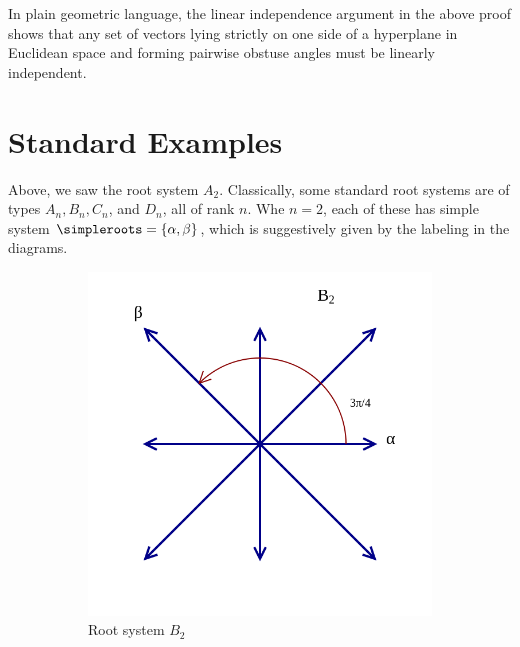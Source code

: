 \documentclass[11pt,leqno,oneside]{amsart}
\numberwithin{thm}{section}
\begin{document}
\begin{rmk}
  In plain geometric language, the linear independence argument in the
  above proof shows that any set of
  vectors lying strictly on one 
  side of a hyperplane in Euclidean space and forming pairwise obstuse
  angles must be linearly independent.
\end{rmk}
\section{Standard Examples}\label{standard-examples}
Above, we saw the root system \(A_2\). Classically, some standard
 root systems are of types \(A_n, B_n, C_n\), and
\(D_n\), all of rank \(n\). Whe \(n=2\), each of these has simple system \(\simpleroots =
\{\alpha,\beta\}\), which is suggestively given by the labeling in the diagrams.
\begin{figure}
  \begin{subfigure}{.3\textwidth}
    \centering
    \includegraphics[width=\textwidth]{images/Root_system_B2_with_labels.png}
    \caption{Root system $B_2$}
  \end{subfigure}
  \begin{subfigure}{.3\textwidth}
    \centering

\end{subfigure}
\end{figure}
\end{document}

